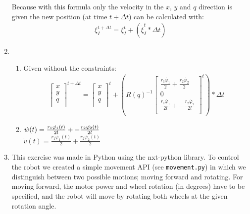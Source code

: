 \documentclass[a4paper, 20pt]{report}
\begin{document}
\begin{enumerate}
        Because with this formula only the velocity in the $x$, $y$ and $q$
        direction is given the new position (at time $t+\Delta t$) can be calculated with:
        \begin{align*}
            \xi^{t + \Delta t}_I = \xi^{t}_I + (\dot{\xi}^{t}_I *\Delta t )
        \end{align*}
    \item
    \begin{enumerate}{a} 
    \item Given without the constraints:
                \begin{align*}
                    \begin{bmatrix}
                        x\\
                        y\\
                        q\\
                    \end{bmatrix}^{t + \Delta t}
                    = 
                    \begin{bmatrix}
                        x\\
                        y\\
                        q\\
                    \end{bmatrix}^{t}
                    +( R(q)^{-1}  
                    \begin{bmatrix}
                        \frac{r_1\dot{\varphi_1}}{2} + \frac{r_2\dot{\varphi_2}}{2}\\
                        0\\
                        \frac{r_1\dot{\varphi_1}}{2l} + -\frac{r_2\dot{\varphi_2}}{2l}\\ 
                    \end{bmatrix}^{t}) * \Delta t
                \end{align*}
        \item
            $ \dot{w}(t) = \large{\frac{r_1\dot{\varphi_1}(t)}{2l} +
                -\frac{r_2\dot{\varphi_2}(t)}{2l}}$\\
                $ \dot{v}(t) = \frac{r_1\dot{\varphi_1}(t)}{2} +
                \frac{r_2\dot{\varphi_2}(t)}{2}$
        \end{enumerate}

    \item
            This exercise was made in Python using the nxt-python library. To
            control the robot we created a simple movement API (see \texttt{movement.py})
            in which we distinguish between two possible motions; moving forward
            and rotating. For moving forward, the motor power and wheel rotation
            (in degrees) have to be specified, and the robot will move by
            rotating both wheels at the given rotation angle. 
            

\end{enumerate}
\end{document}
